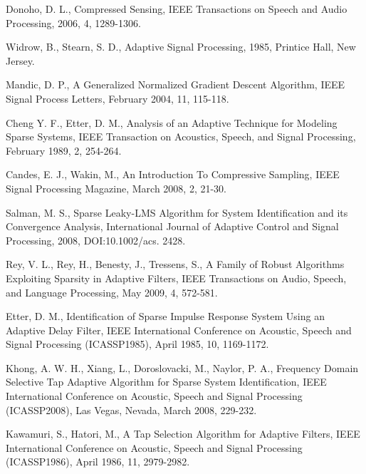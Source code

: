 Donoho, D. L., Compressed Sensing, IEEE Transactions on Speech and Audio Processing, 2006, 4, 1289-1306.

Widrow, B., Stearn, S. D., Adaptive Signal Processing, 1985, Printice Hall, New Jersey.





%
Mandic, D. P., A Generalized Normalized Gradient Descent Algorithm, IEEE Signal Process Letters, February 2004, 11, 115-118.


Cheng Y. F., Etter, D. M., Analysis of an Adaptive Technique for Modeling Sparse Systems, IEEE Transaction on Acoustics, Speech, and Signal
Processing, February 1989, 2, 254-264.



Candes, E. J., Wakin, M., An Introduction To Compressive Sampling, IEEE Signal Processing Magazine, March 2008, 2, 21-30.

Salman, M. S., Sparse Leaky-LMS Algorithm for System Identification and its Convergence Analysis, International Journal of Adaptive Control and Signal Processing, 2008, DOI:10.1002/acs. 2428.

Rey, V. L., Rey, H., Benesty, J., Tressens, S., A Family of Robust Algorithms Exploiting Sparsity in Adaptive Filters, IEEE Transactions on Audio, Speech, and Language Processing, May 2009, 4, 572-581.

Etter, D. M., Identification of Sparse Impulse Response System Using an Adaptive Delay Filter, IEEE International Conference on  Acoustic, Speech and Signal Processing (ICASSP1985), April 1985, 10, 1169-1172.




Khong, A. W. H., Xiang, L., Doroslovacki, M., Naylor, P. A., Frequency Domain Selective Tap Adaptive Algorithm for Sparse System Identification, IEEE International Conference on  Acoustic, Speech and Signal Processing (ICASSP2008), Las Vegas, Nevada, March 2008, 229-232.

Kawamuri, S., Hatori,  M., A Tap Selection Algorithm for Adaptive Filters, IEEE International Conference on  Acoustic, Speech and Signal Processing (ICASSP1986), April 1986, 11, 2979-2982.

